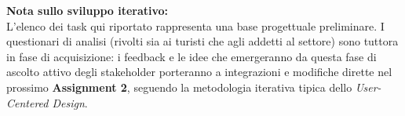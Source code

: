 \vspace{0.6cm}

\textbf{Nota sullo sviluppo iterativo:}\\
L'elenco dei task qui riportato rappresenta una base progettuale preliminare. I questionari di analisi (rivolti sia ai turisti che agli addetti al settore) sono tuttora in fase di acquisizione: i feedback e le idee che emergeranno da questa fase di ascolto attivo degli stakeholder porteranno a integrazioni e modifiche dirette nel prossimo \textbf{Assignment 2}, seguendo la metodologia iterativa tipica dello \textit{User-Centered Design}.

